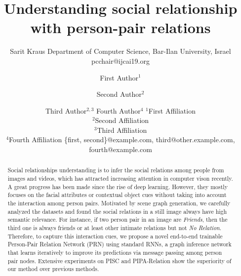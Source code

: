 \documentclass{article}
\title{Understanding social relationship with person-pair relations}
\author{
    Sarit Kraus
    \affiliations
    Department of Computer Science, Bar-Ilan University, Israel \emails
    pcchair@ijcai19.org
}
\author{
First Author$^1$
\and
Second Author$^2$\and
Third Author$^{2,3}$\And
Fourth Author$^4$
\affiliations
$^1$First Affiliation\\
$^2$Second Affiliation\\
$^3$Third Affiliation\\
$^4$Fourth Affiliation
\emails
\{first, second\}@example.com,
third@other.example.com,
fourth@example.com
}
\begin{document}
\maketitle

\begin{abstract}

Social relationships understanding is to infer the social relations among people from images and videos, which has attracted increasing attention in computer vison recently. A great progress has been made since the rise of deep learning. However, they mostly focuses on the facial attributes or contextual object cues without taking into account the interaction among person pairs. Motivated by scene graph generation, we carefully analyzed the datasets and found the social relations in a still image always have high semantic relevance. For instance, if two person pair in an image are {\it Friends}, then the third one is always friends or at least other intimate relations but not {\it No Relation}. Therefore, to capture this interaction cues, we propose a novel end-to-end trainable Person-Pair Relation Network (PRN) using standard RNNs, a graph inference network that learns iteratively to improve its predictions via message passing among person pair nodes. Extensive experiments on PISC and PIPA-Relation show the superiority of our method over previous methods. 

\end{abstract}
\end{document}
